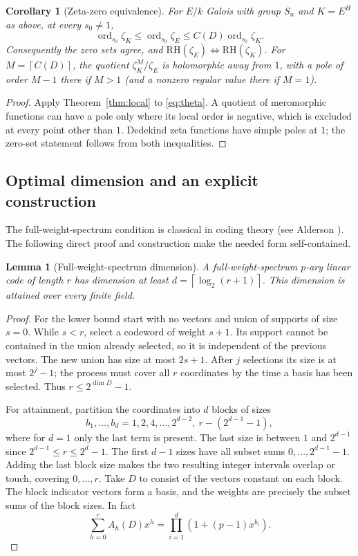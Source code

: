 \documentclass[11pt]{article}
\newtheorem{lemma}[theorem]{Lemma}
\newtheorem{corollary}[theorem]{Corollary}
\theoremstyle{remark}\newtheorem{remark}[theorem]{Remark}
\newcommand{\ord}{\operatorname{ord}}
\newcommand{\RH}{\mathrm{RH}}
\newcommand{\ceil}[1]{\left\lceil #1\right\rceil}
\begin{document}
\begin{corollary}[Zeta-zero equivalence]\label{cor:zero}
For $E/k$ Galois with group $S_n$ and $K=E^H$ as above, at every $s_0\ne1$,
\[
 \ord_{s_0}\zeta_K\le\ord_{s_0}\zeta_E\le C(D)\ord_{s_0}\zeta_K.
\]
Consequently the zero sets agree, and $\RH(\zeta_E)\iff\RH(\zeta_K)$. For $M=\ceil{C(D)}$, the quotient $\zeta_K^M/\zeta_E$ is holomorphic away from $1$, with a pole of order $M-1$ there if $M>1$ (and a nonzero regular value there if $M=1$).
\end{corollary}
\begin{proof}
Apply Theorem~\ref{thm:local} to \eqref{eq:theta}. A quotient of meromorphic functions can have a pole only where its local order is negative, which is excluded at every point other than $1$. Dedekind zeta functions have simple poles at $1$; the zero-set statement follows from both inequalities.
\end{proof}

\subsection{Optimal dimension and an explicit construction}
The full-weight-spectrum condition is classical in coding theory (see Alderson \cite{alderson}). The following direct proof and construction make the needed form self-contained.
\begin{lemma}[Full-weight-spectrum dimension]\label{lem:dimension}
A full-weight-spectrum $p$-ary linear code of length $r$ has dimension at least $d=\ceil{\log_2(r+1)}$. This dimension is attained over every finite field.
\end{lemma}
\begin{proof}
For the lower bound start with no vectors and union of supports of size $s=0$. While $s<r$, select a codeword of weight $s+1$. Its support cannot be contained in the union already selected, so it is independent of the previous vectors. The new union has size at most $2s+1$. After $j$ selections its size is at most $2^j-1$; the process must cover all $r$ coordinates by the time a basis has been selected. Thus $r\le2^{\dim D}-1$.

For attainment, partition the coordinates into $d$ blocks of sizes
\begin{equation}\label{eq:blocks}
 b_1,\ldots,b_d=1,2,4,\ldots,2^{d-2},\ r-(2^{d-1}-1),
\end{equation}
where for $d=1$ only the last term is present. The last size is between $1$ and $2^{d-1}$ since $2^{d-1}\le r\le2^d-1$. The first $d-1$ sizes have all subset sums $0,\ldots,2^{d-1}-1$. Adding the last block size makes the two resulting integer intervals overlap or touch, covering $0,\ldots,r$. Take $D$ to consist of the vectors constant on each block. The block indicator vectors form a basis, and the weights are precisely the subset sums of the block sizes. In fact
\begin{equation}\label{eq:weightD}
 \sum_{h=0}^r A_h(D)x^h=\prod_{i=1}^d(1+(p-1)x^{b_i}).
\end{equation}
\end{proof}
\end{document}

